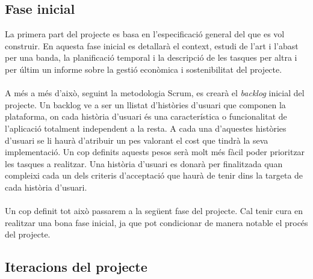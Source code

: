 \subsection{Fase inicial}

La primera part del projecte es basa en l'especificació general del que es vol construir. En aquesta fase inicial es detallarà el context, estudi de l'art i l'abast per una banda, la planificació temporal i la descripció de les tasques per altra i per últim un informe sobre la gestió econòmica i sostenibilitat del projecte.
\\\\
A més a més d'això, seguint la metodologia Scrum, es crearà el \textit{backlog} inicial del projecte. Un backlog ve a ser un llistat d'històries d'usuari que componen la plataforma, on cada història d'usuari és una característica o funcionalitat de l'aplicació totalment independent a la resta. A cada una d'aquestes històries d'usuari se li haurà d'atribuir un pes valorant el cost que tindrà la seva implementació. Un cop definits aquests pesos serà molt més fàcil poder prioritzar les tasques a realitzar. Una història d'usuari es donarà per finalitzada quan compleixi cada un dels criteris d'acceptació que haurà de tenir dins la targeta de cada història d'usuari.
\\\\
Un cop definit tot això passarem a la següent fase del projecte. Cal tenir cura en realitzar una bona fase inicial, ja que pot condicionar de manera notable el procés del projecte.

\subsection{Iteracions del projecte}

